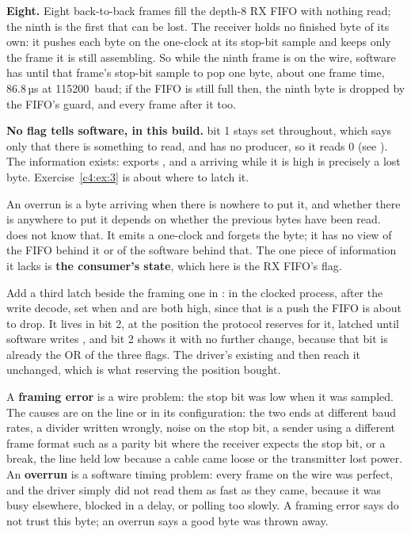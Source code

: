  \textbf{Eight.} Eight back-to-back frames fill the depth-8 RX FIFO with nothing read; the
ninth is the first that can be lost. The receiver holds no finished byte of its own: it pushes each
byte on the one-clock  at its stop-bit sample and keeps only the frame it is still
assembling. So while the ninth frame is on the wire, software has until that frame's stop-bit sample
to pop one byte, about one frame time, 86.8\,µs at 115200~baud; if the FIFO is still full
then, the ninth byte is dropped by the FIFO's  guard, and every frame after it too.

\textbf{No flag tells software, in this build.}  bit 1 stays set throughout, which says
only that there is something to read, and  has no producer, so it reads 0 (see
). The information exists:  exports , and a
 arriving while it is high is precisely a lost byte. Exercise~\ref{c4:ex:3} is about
where to latch it.

 An overrun is a byte arriving when there is nowhere to put it, and whether there is anywhere
to put it depends on whether the previous bytes have been read.  does not know that. It
emits a one-clock  and forgets the byte; it has no view of the FIFO behind it or of the
software behind that. The one piece of information it lacks is \textbf{the consumer's state}, which
here is the RX FIFO's  flag.

 Add a third latch beside the framing one in : in the clocked process, after
the write decode, set  when  and  are both
high, since that is a push the FIFO is about to drop. It lives in  bit 2, at the
position the protocol reserves for it, latched until software writes , and 
bit 2 shows it with no further change, because that bit is already the OR of the three flags. The
driver's existing  and  then reach it unchanged, which is what
reserving the position bought.

 A \textbf{framing error} is a wire problem: the stop bit was low when it was sampled. The
causes are on the line or in its configuration: the two ends at different baud rates, a divider
written wrongly, noise on the stop bit, a sender using a different frame format such as a parity bit
where the receiver expects the stop bit, or a break, the line held low because a cable came loose
or the transmitter lost power. An \textbf{overrun} is a software timing problem: every frame on the
wire was perfect, and the driver simply did not read them as fast as they came, because it was busy
elsewhere, blocked in a delay, or polling too slowly. A framing error says do not trust this byte; an
overrun says a good byte was thrown away.
